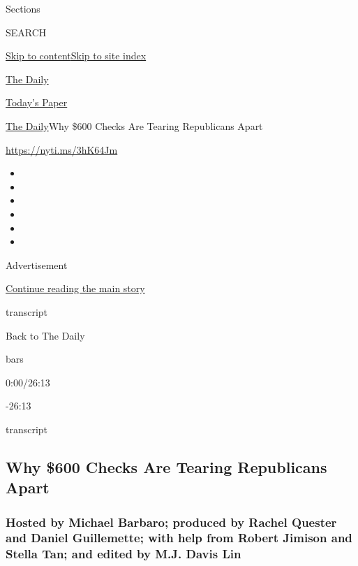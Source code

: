 Sections

SEARCH

\protect\hyperlink{site-content}{Skip to
content}\protect\hyperlink{site-index}{Skip to site index}

\href{https://www.nytimes3xbfgragh.onion/podcasts/the-daily}{The Daily}

\href{https://myaccount.nytimes3xbfgragh.onion/auth/login?response_type=cookie\&client_id=vi}{}

\href{https://www.nytimes3xbfgragh.onion/section/todayspaper}{Today's
Paper}

\href{/podcasts/the-daily}{The Daily}\textbar{}Why \$600 Checks Are
Tearing Republicans Apart

\url{https://nyti.ms/3hK64Jm}

\begin{itemize}
\item
\item
\item
\item
\item
\item
\end{itemize}

Advertisement

\protect\hyperlink{after-top}{Continue reading the main story}

transcript

Back to The Daily

bars

0:00/26:13

-26:13

transcript

\hypertarget{why-600-checks-are-tearing-republicans-apart}{%
\subsection{Why \$600 Checks Are Tearing Republicans
Apart}\label{why-600-checks-are-tearing-republicans-apart}}

\hypertarget{hosted-by-michael-barbaro-produced-by-rachel-quester-and-daniel-guillemette-with-help-from-robert-jimison-and-stella-tan-and-edited-by-mj-davis-lin}{%
\subsubsection{Hosted by Michael Barbaro; produced by Rachel Quester and
Daniel Guillemette; with help from Robert Jimison and Stella Tan; and
edited by M.J. Davis
Lin}\label{hosted-by-michael-barbaro-produced-by-rachel-quester-and-daniel-guillemette-with-help-from-robert-jimison-and-stella-tan-and-edited-by-mj-davis-lin}}

